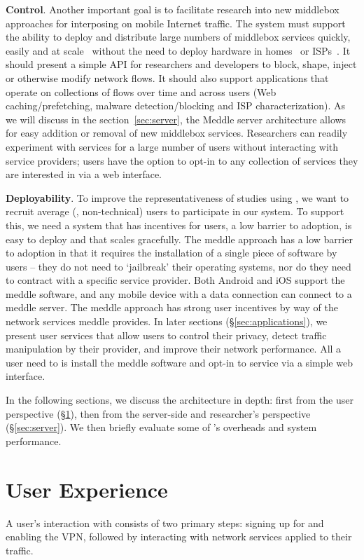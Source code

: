 \noindent\textbf{Control}. Another important goal is to facilitate research into new middlebox approaches 
for interposing on mobile Internet traffic. The system must support the ability to deploy and distribute large numbers 
of middlebox services quickly, easily and at scale~\cite{sherry:middleboxes} without 
the need to deploy hardware in homes~\cite{bismark} or ISPs~\cite{wang:middleboxes}. 
It should present a simple API for researchers and developers to block, shape, inject or otherwise 
modify network flows. It should also support applications that operate on collections of flows over 
time and across users (\eg Web caching/prefetching, malware detection/blocking and ISP characterization). 
As we will discuss in the section~\ref{sec:server}, the Meddle server architecture allows for easy addition or removal of new middlebox services.
Researchers can readily experiment with services for a large number of users without interacting with service providers; users have the option to opt-in to any collection of services they are interested in via a web interface. 


\noindent\textbf{Deployability}. To improve the representativeness of studies using \meddle, we want to 
recruit average (\ie, non-technical) users to participate in our system. To support this, we need a system 
that has incentives for users, a low barrier to adoption, is easy to deploy and that scales gracefully. 
The meddle approach has a low barrier to adoption in that it requires the installation of a single piece of software by users -- they do not need to `jailbreak' their operating systems, nor do they need to contract with a specific service provider. 
Both Android and iOS support the meddle software, and any mobile device with a data connection can connect to a meddle server.
The meddle approach has strong user incentives by way of the network services meddle provides.
In later sections (\S\ref{sec:applications}), we present user services that allow users to control their privacy, detect traffic manipulation by their provider, and improve their network performance.
All a user need to is install the meddle software and opt-in to service via a simple web interface.

In the following sections, we discuss the \meddle architecture in depth: first from the user perspective (\S\ref{sec:user}), then from the server-side and researcher's perspective (\S\ref{sec:server}). We then briefly evaluate some of \meddle's overheads and system performance.

\section{User Experience}
\label{sec:user}
A user's interaction with \meddle consists of two primary steps: signing up for \meddle and enabling the VPN, followed by interacting with network services applied to their traffic.


